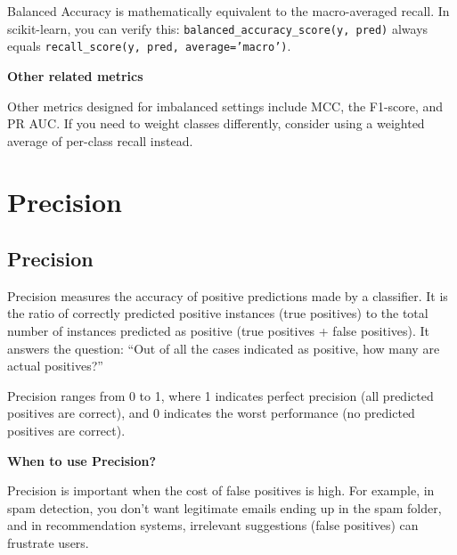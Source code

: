 {Balanced Accuracy is mathematically equivalent to the macro-averaged recall. In scikit-learn, you can verify this:
\texttt{balanced\_accuracy\_score(y, pred)} always equals \texttt{recall\_score(y, pred, average='macro')}.}

\textbf{Other related metrics}

Other metrics designed for imbalanced settings include MCC, the F1-score, and PR AUC.
If you need to weight classes differently, consider using a weighted average of per-class recall instead.

\clearpage
\thispagestyle{classificationstyle}
\section{Precision}
\subsection{Precision}

Precision measures the accuracy of positive predictions made by a classifier. It is the ratio of correctly predicted positive instances (true positives) to
the total number of instances predicted as positive (true positives + false positives). It answers the question: “Out of all the cases indicated as positive, how many are actual positives?”

\begin{center}
\end{center}

Precision ranges from 0 to 1, where 1 indicates perfect precision (all predicted positives are correct), and 0 indicates the worst performance (no predicted positives are correct).

\textbf{When to use Precision?}

Precision is important when the cost of false positives is high. For example, in spam detection, you don’t want legitimate emails ending up in the spam folder,
and in recommendation systems, irrelevant suggestions (false positives) can frustrate users.


